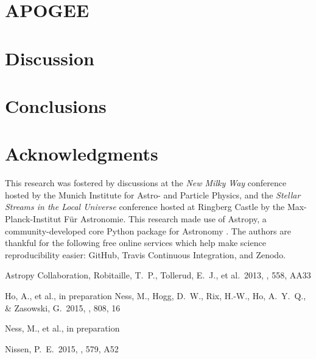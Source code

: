 \documentclass[useAMS,usenatbib]{mn2e}
\begin{document}



\section{APOGEE}





\section{Discussion}





\section{Conclusions}

% 


\section*{Acknowledgments}
This research was fostered by discussions at the \textit{New Milky Way}
conference hosted by the Munich Institute for Astro- and Particle Physics, and
the \textit{Stellar Streams in the Local Universe} conference hosted at Ringberg
Castle by the Max-Planck-Institut F\"ur Astronomie. This research made use of 
Astropy, a community-developed core Python package for Astronomy \citep{astropy}.
The authors are thankful for the following free online services which help make
science reproducibility easier: GitHub, Travis Continuous Integration, and Zenodo.

\begin{thebibliography}{99}
 Astropy Collaboration, Robitaille, T.~P., Tollerud, E.~J., et al.\ 2013, \aap, 558, AA33

 Ho, A., et al., in preparation
 Ness, M., Hogg, D.~W., Rix, H.-W., Ho, A.~Y.~Q., \& Zasowski, G.\ 2015, \apj, 808, 16 

 Ness, M., et al., in preparation

 Nissen, P.~E.\ 2015, \aap, 579, A52 


\end{thebibliography}
\end{document}
